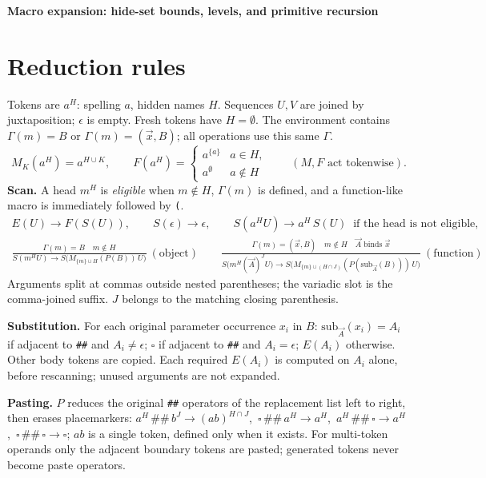 \documentclass[10pt]{article}
\theoremstyle{definition}
\theoremstyle{remark}
\newcommand{\Sc}{S}\newcommand{\Ex}{E}\newcommand{\Mk}{M}\newcommand{\Fn}{F}\newcommand{\Pp}{P}
\newcommand{\tok}[1]{\texttt{#1}}
\begin{document}
\sloppy
\begin{center}{\large\bfseries Macro expansion: hide-set bounds, levels, and primitive recursion}\end{center}

\section{Reduction rules}
Tokens are $a^H$: spelling $a$, hidden names $H$. Sequences $U,V$ are joined by juxtaposition; $\epsilon$ is empty. Fresh tokens
have $H=\emptyset$. The environment contains $\Gamma(m)=B$ or $\Gamma(m)=(\vec x,B)$; all operations use this same $\Gamma$.
\[
\Mk_K(a^H)=a^{H\cup K},\qquad
\Fn(a^H)=\begin{cases}a^{\{a\}}& a\in H,\\ a^{\emptyset}& a\notin H\end{cases}\qquad(\Mk,\Fn\text{ act tokenwise}).
\]
\textbf{Scan.} A head $m^H$ is \emph{eligible} when $m\notin H$, $\Gamma(m)$ is defined, and a function-like macro is
immediately followed by \tok{(}.
\begin{gather*}
\Ex(U)\to\Fn(\Sc(U)),\qquad \Sc(\epsilon)\to\epsilon,\qquad \Sc(a^HU)\to a^H\,\Sc(U)\ \text{ if the head is not eligible},\\
\frac{\Gamma(m)=B\quad m\notin H}{\Sc(m^HU)\to\Sc\big(\Mk_{\{m\}\cup H}(\Pp(B))\,U\big)}\ (\text{object})\qquad
\frac{\Gamma(m)=(\vec x,B)\quad m\notin H\quad \vec A\text{ binds }\vec x}{\Sc\big(m^H(\vec A)^JU\big)\to\Sc\big(\Mk_{\{m\}\cup(H\cap J)}(\Pp(\mathrm{sub}_{\vec A}(B)))\,U\big)}\ (\text{function})
\end{gather*}
Arguments split at commas outside nested parentheses; the variadic slot is the comma-joined suffix. $J$ belongs to the
matching closing parenthesis.

\textbf{Substitution.} For each original parameter occurrence $x_i$ in $B$: $\mathrm{sub}_{\vec A}(x_i)=A_i$ if adjacent to
\tok{\#\#} and $A_i\neq\epsilon$; $\square$ if adjacent to \tok{\#\#} and $A_i=\epsilon$; $\Ex(A_i)$ otherwise. Other body
tokens are copied. Each required $\Ex(A_i)$ is computed on $A_i$ alone, before rescanning; unused arguments are not
expanded.

\textbf{Pasting.} $\Pp$ reduces the original \tok{\#\#} operators of the replacement list left to right, then erases
placemarkers:
$a^H\,\tok{\#\#}\,b^J\to(ab)^{H\cap J}$,\ $\square\,\tok{\#\#}\,a^H\to a^H$,\ $a^H\,\tok{\#\#}\,\square\to a^H$,\
$\square\,\tok{\#\#}\,\square\to\square$; $ab$ is a single token, defined only when it exists. For multi-token operands
only the adjacent boundary tokens are pasted; generated tokens never become paste operators.
\end{document}
